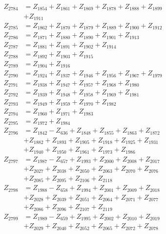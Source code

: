 \begin{multicols}{2}
\begin{align}
Z_{2784} &= Z_{1854} + Z_{1861} + Z_{1869} + Z_{1878} + Z_{1888} + Z_{1899}  \nonumber \\
&+ Z_{1911} \nonumber \\
Z_{2785} &= Z_{1862} + Z_{1870} + Z_{1879} + Z_{1889} + Z_{1900} + Z_{1912} \nonumber \\
Z_{2786} &= Z_{1871} + Z_{1880} + Z_{1890} + Z_{1901} + Z_{1913} \nonumber \\
Z_{2787} &= Z_{1881} + Z_{1891} + Z_{1902} + Z_{1914} \nonumber \\
Z_{2788} &= Z_{1892} + Z_{1903} + Z_{1915} \nonumber \\
Z_{2789} &= Z_{1904} + Z_{1916} \nonumber \\
Z_{2790} &= Z_{1924} + Z_{1937} + Z_{1946} + Z_{1956} + Z_{1967} + Z_{1979} \nonumber \\
Z_{2791} &= Z_{1938} + Z_{1947} + Z_{1957} + Z_{1968} + Z_{1980} \nonumber \\
Z_{2792} &= Z_{1939} + Z_{1948} + Z_{1958} + Z_{1969} + Z_{1981} \nonumber \\
Z_{2793} &= Z_{1949} + Z_{1959} + Z_{1970} + Z_{1982} \nonumber \\
Z_{2794} &= Z_{1960} + Z_{1971} + Z_{1983} \nonumber \\
Z_{2795} &= Z_{1972} + Z_{1984} \nonumber \\
Z_{2796} &= Z_{1842} - Z_{636} + Z_{1848} + Z_{1855} + Z_{1863} + Z_{1872}  \nonumber \\
&+ Z_{1882} + Z_{1893} + Z_{1905} + Z_{1918} + Z_{1925} + Z_{1931}  \nonumber \\
&+ Z_{1940} + Z_{1950} + Z_{1961} + Z_{1973} + Z_{1986} \nonumber \\
Z_{2797} &= Z_{1987} - Z_{657} + Z_{1993} + Z_{2000} + Z_{2008} + Z_{2017}  \nonumber \\
&+ Z_{2027} + Z_{2038} + Z_{2050} + Z_{2063} + Z_{2070} + Z_{2076}  \nonumber \\
&+ Z_{2085} + Z_{2095} + Z_{2106} + Z_{2118} \nonumber \\
Z_{2798} &= Z_{1988} - Z_{658} + Z_{1994} + Z_{2001} + Z_{2009} + Z_{2018}  \nonumber \\
&+ Z_{2028} + Z_{2039} + Z_{2051} + Z_{2064} + Z_{2071} + Z_{2077}  \nonumber \\
&+ Z_{2086} + Z_{2096} + Z_{2107} + Z_{2119} \nonumber \\
Z_{2799} &= Z_{1989} - Z_{659} + Z_{1995} + Z_{2002} + Z_{2010} + Z_{2019}  \nonumber \\
&+ Z_{2029} + Z_{2040} + Z_{2052} + Z_{2065} + Z_{2072} + Z_{2078}  \nonumber \\

\end{align}
\end{multicols}
